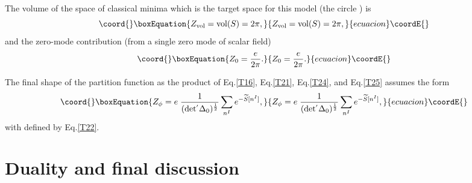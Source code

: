 \documentclass[a4paper,12pt]{article}
\begin{document}
The volume of the space of classical minima which is the target
space for this model (the circle \coordHE{}) is
\begin{equation}\coord{}\boxEquation{\label{T24}
Z_{\rm vol}={\rm vol} (S) = 2\pi,
}{Z_{\rm vol}={\rm vol} (S) = 2\pi,
}{ecuacion}\coordE{}\end{equation}
and the zero-mode contribution (from a single zero mode of scalar field)
\begin{equation}\coord{}\boxEquation{\label{T25}
Z_{0}=\frac{e}{2\pi}.
}{Z_{0}=\frac{e}{2\pi}.
}{ecuacion}\coordE{}\end{equation}

The final shape of the partition function as the product of
Eq.\eqref{T16}, Eq.\eqref{T21}, Eq.\eqref{T24}, and Eq.\eqref{T25}
assumes the form
\begin{equation}\coord{}\boxEquation{\label{T26}
Z_{\phi}=e \; \frac{1}{ (\rm det^{'}\Delta_{0})^{ \frac{1}{2} }}
\sum_{n^{I} } e^{-\widetilde{S}[n^{I}]},
}{Z_{\phi}=e \; \frac{1}{ (\rm det^{'}\Delta_{0})^{ \frac{1}{2} }}
\sum_{n^{I} } e^{-\widetilde{S}[n^{I}]},
}{ecuacion}\coordE{}\end{equation}
with \coordHE{} defined by Eq.\eqref{T22}.

\section{Duality and final discussion}
\end{document}
